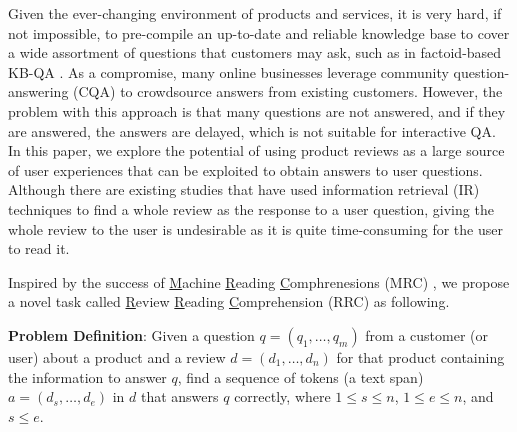 Given the ever-changing environment of products and services, it is very hard, if not impossible, to pre-compile an up-to-date and reliable knowledge base to cover a wide assortment of questions that customers may ask, such as in factoid-based KB-QA \cite{xu2016question,fader2014open,kwok2001scaling,yin2015neural}.
As a compromise, many online businesses leverage community question-answering (CQA) \cite{mcauley2016addressing} to crowdsource answers from existing customers. However, the problem with this approach is that many questions are not answered, and if they are answered, the answers are delayed, which is not suitable for interactive QA.
In this paper, we explore the potential of using product reviews as a large source of user experiences that can be exploited to obtain answers to user questions. Although there are existing studies that have used information retrieval (IR) techniques \cite{mcauley2016addressing,yu2018aware} to find a whole review as the response to a user question, giving the whole review to the user is undesirable as it is quite time-consuming for the user to read it.

Inspired by the success of \underline{M}achine \underline{R}eading \underline{C}omphrenesions (MRC) \cite{rajpurkar2016squad,rajpurkar2018know}, we propose a novel task called \underline{R}eview \underline{R}eading \underline{C}omprehension (RRC) as following.

\textbf{Problem Definition}: Given a question $q=(q_1, \dots, q_m)$ from a customer (or user) about a product and a review $d=(d_1, \dots, d_n)$ for that product containing the information to answer $q$, find a sequence of tokens (a text span) $a=(d_s, \dots, d_e)$ in $d$ that answers $q$ correctly, where $1 \le s \le n$, $1\le e \le n$, and $s\le e$.

